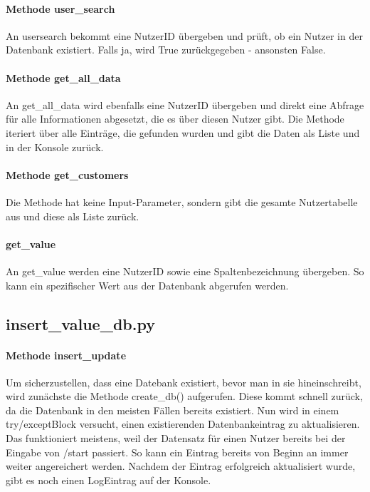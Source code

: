             \paragraph{Methode user\_search}
                An user\-search bekommt eine Nutzer\-ID übergeben und prüft, ob ein Nutzer in der Datenbank existiert. Falls ja, wird True zurückgegeben - ansonsten False.

            \paragraph{Methode get\_all\_data}
                An get\_all\_data wird ebenfalls eine Nutzer\-ID übergeben und direkt eine Abfrage für alle Informationen abgesetzt, die es über diesen Nutzer gibt. Die Methode iteriert über alle Einträge, die gefunden wurden und gibt die Daten als Liste und in der Konsole zurück.
                
            \paragraph{Methode get\_customers}
                Die Methode hat keine Input-Parameter, sondern gibt die gesamte Nutzertabelle aus und diese als Liste zurück.

            \paragraph{get\_value}
                An get\_value werden eine Nutzer\-ID sowie eine Spaltenbezeichnung übergeben. So kann ein spezifischer Wert aus der Datenbank abgerufen werden. 

        \subsection{insert\_value\_db.py}
            \paragraph{Methode insert\_update}
                Um sicherzustellen, dass eine Datebank existiert, bevor man in sie hineinschreibt, wird zunächste die Methode create\_db() aufgerufen. Diese kommt schnell zurück, da die Datenbank in den meisten Fällen bereits existiert. Nun wird in einem try/except\-Block versucht, einen existierenden Datenbankeintrag zu aktualisieren. Das funktioniert meistens, weil der Datensatz für einen Nutzer bereits bei der Eingabe von /start passiert. So kann ein Eintrag bereits von Beginn an immer weiter angereichert werden. Nachdem der Eintrag erfolgreich aktualisiert wurde, gibt es noch einen Log\-Eintrag auf der Konsole.  
        
